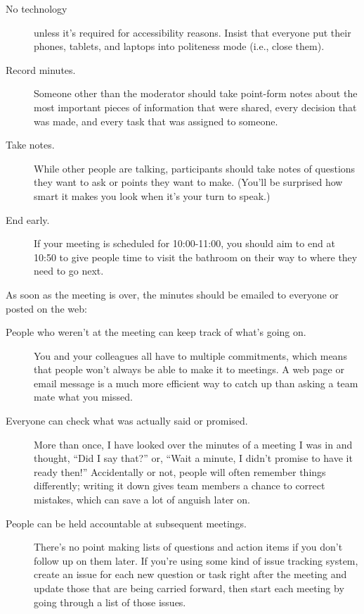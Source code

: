 \begin{description}
\item[No technology]
  unless it's required for accessibility reasons.
  Insist that everyone put their phones, tablets, and laptops into politeness mode
  (i.e., close them).

\item[Record minutes.]
  Someone other than the moderator should take point-form notes about
  the most important pieces of information that were shared,
  every decision that was made,
  and every task that was assigned to someone.

\item[Take notes.]
  While other people are talking,
  participants should take notes of questions they want to ask or points they want to make.
  (You'll be surprised how smart it makes you look when it's your turn to speak.)

\item[End early.]
  If your meeting is scheduled for 10:00-11:00,
  you should aim to end at 10:50 to give people time to visit the bathroom
  on their way to where they need to go next.

\end{description}

As soon as the meeting is over,
the minutes should be emailed to everyone
or posted on the web:

\begin{description}

\item[People who weren't at the meeting can keep track of what's going on.]
  You and your colleagues all have to multiple commitments,
  which means that people won't always be able to make it to meetings.
  A web page or email message is a much more efficient way to catch up
  than asking a team mate what you missed.

\item[Everyone can check what was actually said or promised.]
  More than once,
  I have looked over the minutes of a meeting I was in
  and thought, ``Did I say that?''
  or, ``Wait a minute, I didn't promise to have it ready then!''
  Accidentally or not,
  people will often remember things differently;
  writing it down gives team members a chance to correct mistakes,
  which can save a lot of anguish later on.

\item[People can be held accountable at subsequent meetings.]
  There's no point making lists of questions and action items
  if you don't follow up on them later.
  If you're using some kind of issue tracking system,
  create an issue for each new question or task right after the meeting
  and update those that are being carried forward,
  then start each meeting by going through a list of those issues.

\end{description}

